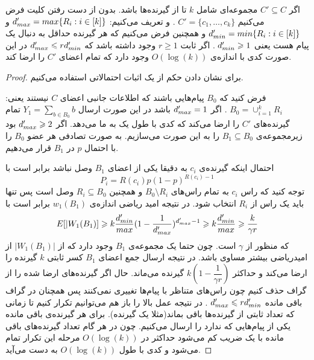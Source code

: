 \begin{lemma}
	\label{lemma:pliable2015:3}
	اگر
	$C' \subseteq C$
	مجموعه‌ای شامل 
	$k$
	تا از گیرنده‌‌ها باشد. بدون از دست رفتن کلیت فرض می‌کنیم
	$C' = \{c_1, \ldots, c_k\}$
	. و تعریف می‌کنیم:
	$d_{max}' = max\{R_i: i \in [k] \}$
	و
	$d_{min}' = min\{R_i: i \in [k] \}$
	و همچنین فرض می‌کنیم که هر گیرنده حداقل به دنبال یک پیام هست یعنی
	$d_{min}' \geqslant 1$
	. اگر ثابت
	$r \geq 1$
	وجود داشته باشد که
	$d_{max}' \leqslant r d_{min}'$
	در این صورت کدی با اندازه‌ی
	$O(\log(k))$
	وجود دارد که تمام اعضای
	$C'$
	را ارضا کند.
\end{lemma}
\begin{proof}
	برای نشان دادن حکم از یک اثبات احتمالاتی استفاده می‌کنیم.
	
	فرض کنید که
	$B_0$
	پیام‌هایی باشند که اطلاعات جانبی اعضای
	$C$
	نیستند یعنی:
	$B_0 = \cup_{i = 1}^{k} R_i$
	. اگر
	$d_{max}' = 1$
	باشد در این صورت ارسال
	$Y_1 = \sum_{b \in B_0} b$
	تمام گیرنده‌های
	$C'$
	را ارضا می‌کند که کدی با طول یک به ما می‌دهد. اگر
	$d_{max}' \geqslant 2$
	بود زیرمجموعه‌ی
	$B_1 \subseteq B_0$
	را به این صورت می‌سازیم. به صورت تصادفی هر عضو
	$B_0$
	را با احتمال
	$p$
	در 
	$B_1$
	قرار می‌دهیم.
	
	احتمال اینکه گیرنده‌ی
	$c_i$
	به دقیقا یکی از اعضای 
	$B_1$
	وصل نباشد برابر است با
	$$P_i = R(c_i) p (1 - p)^{R(c_i) - 1}$$
	توجه کنید که راس
	$c_i$
	به تمام راس‌های
	$B_0 \setminus R_i$
	و همچنین
	$R_i \subseteq B_0$
	وصل است پس تنها باید یک راس از
	$R_i$
	انتخاب شود. در نتیجه امید ریاضی اندازه‌ی
	$w_1(B_1)$
	برابر است با
	\begin{equation}
		E[|W_1(B_1)] \geqslant k \dfrac{d_{min}'}{max}(1 - \dfrac{1}{d_{max}'})^{d_{max}' - 1} \geqslant k \dfrac{d_{min}'}{max} \geqslant \dfrac{k}{\gamma r}
	\end{equation}
	که منظور از
	$\gamma$
	است. چون حتما یک مجموعه‌ی
	$B_1$
	وجود دارد که از 
	$|W_1(B_1)|$
	از امیدریاضی بیشتر مساوی باشد. در نتیجه ارسال جمع اعضای
	$B_1$
	کسر ثابتی
	$k$
	گیرنده‌ را ارضا می‌کند و حداکثر
	$k(1 - \dfrac{1}{\gamma r})$
	گیرنده می‌ماند. حال اگر گیرنده‌های ارضا شده را از گراف حذف کنیم چون راس‌های متناظر با پیام‌ها تغییری نمی‌کنند پس همچنان در گراف باقی مانده
	$d_{max}' \leqslant r d_{min}'$
	. در نتیجه عمل بالا را باز هم می‌توانیم تکرار کنیم تا زمانی که تعداد ثابتی از گیرنده‌ها باقی بماند(مثلا یک گیرنده). برای هر گیرنده‌ی باقی مانده یکی از پیام‌هایی که ندارد را ارسال می‌کنیم. چون در هر گام تعداد گیرنده‌های باقی مانده با یک ضریب کم می‌شود حداکثر در
	$O(\log(k))$
	مرحله این تکرار تمام می‌شود و کدی با طول
	$O(\log(k))$
	به دست می‌آید.
\end{proof}

